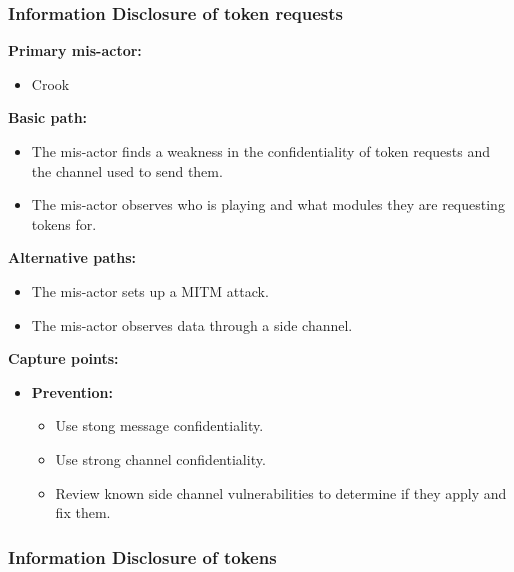 \documentclass[a4paper,11pt]{report}
\begin{document}
\subsubsection{Information Disclosure of token requests}
\textbf{Primary mis-actor:}
\begin{itemize}
\item Crook
\end{itemize}
\textbf{Basic path:}
\begin{itemize}
\item The mis-actor finds a weakness in the confidentiality of token requests and the channel used to send them.
\item The mis-actor observes who is playing and what modules they are requesting tokens for.
\end{itemize}
\textbf{Alternative paths:}
\begin{itemize}
\item The mis-actor sets up a MITM attack.
\item The mis-actor observes data through a side channel.
\end{itemize}
\textbf{Capture points:}
\begin{itemize}
\item \textbf{Prevention:}
\begin{itemize}
\item Use stong message confidentiality.
\item Use strong channel confidentiality.
\item Review known side channel vulnerabilities to determine if they apply and fix them.
\end{itemize}
\end{itemize}

\subsubsection{Information Disclosure of tokens}
\end{document}
